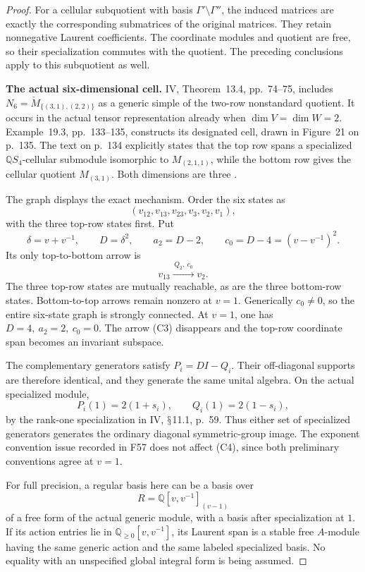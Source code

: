 \documentclass[11pt,a4paper]{article}
\newcommand{\Q}{\mathbb Q}\newcommand{\Z}{\mathbb Z}\newcommand{\C}{\mathbb C}\newcommand{\N}{\mathbb N}\newcommand{\F}{\mathbb F}
\renewcommand{\S}{\ensuremath{\mathsection}}
\newcommand{\fid}[1]{\textsf{#1}}\newcommand{\gate}[1]{\textsf{#1}}
\theoremstyle{named}\newtheorem{finding}{Finding}[section]
\theoremstyle{definition}\newtheorem{definition}[finding]{Definition}
\theoremstyle{remark}\newtheorem{remark}[finding]{Remark}
\begin{document}
\begin{proof}
For a cellular subquotient with basis
\(\Gamma'\setminus\Gamma''\), the induced matrices are exactly
the corresponding submatrices of the original matrices.
They retain nonnegative Laurent coefficients.
The coordinate modules and quotient are free, so their
specialization commutes with the quotient.
The preceding conclusions apply to this subquotient as well.

\par\smallskip\noindent\textbf{The actual six-dimensional cell.}\quad
IV, Theorem~13.4, pp.~74--75, includes
\(N_6=\check M_{\{(3,1),(2,2)\}}\) as a generic simple of the
two-row nonstandard quotient.
It occurs in the actual tensor representation already when
\(\dim V=\dim W=2\).
Example~19.3, pp.~133--135, constructs its designated cell,
drawn in Figure~21 on p.~135.
The text on p.~134 explicitly states that the top row spans
a specialized \(\Q S_4\)-cellular submodule isomorphic to
\(M_{(2,1,1)}\), while the bottom row gives the cellular
quotient \(M_{(3,1)}\).
Both dimensions are three \cite{IV}.

The graph displays the exact mechanism.
Order the six states as
\[
(v_{12},v_{13},v_{23},v_3,v_2,v_1),
\]
with the three top-row states first.
Put
\[
\delta=v+v^{-1},\qquad D=\delta^2,\qquad
a_2=D-2,\qquad c_0=D-4=(v-v^{-1})^2.
\]
Its only top-to-bottom arrow is
\[
v_{13}\xrightarrow{\,Q_2,\ c_0\,}v_2.
\tag{C3}
\]
The three top-row states are mutually reachable, as are
the three bottom-row states.
Bottom-to-top arrows remain nonzero at \(v=1\).
Generically \(c_0\ne0\), so the entire six-state graph is
strongly connected.
At \(v=1\), one has \(D=4,\ a_2=2,\ c_0=0\).
The arrow (C3) disappears and the top-row coordinate span
becomes an invariant subspace.

The complementary generators satisfy \(P_i=DI-Q_i\).
Their off-diagonal supports are therefore identical,
and they generate the same unital algebra.
On the actual specialized module,
\[
P_i(1)=2(1+s_i),\qquad Q_i(1)=2(1-s_i),
\tag{C4}
\]
by the rank-one specialization in IV, \S11.1, p.~59.
Thus either set of specialized generators generates the
ordinary diagonal symmetric-group image.
The exponent convention issue recorded in \fid{F57} does
not affect (C4), since both preliminary conventions agree
at \(v=1\).

For full precision, a regular basis here can be a basis over
\[
R=\Q[v,v^{-1}]_{(v-1)}
\]
of a free form of the actual generic module, with a basis
after specialization at \(1\).
If its action entries lie in \(\Q_{\ge0}[v,v^{-1}]\),
its Laurent span is a stable free \(A\)-module having the
same generic action and the same labeled specialized basis.
No equality with an unspecified global integral form is
being assumed.


\end{proof}
\end{document}
